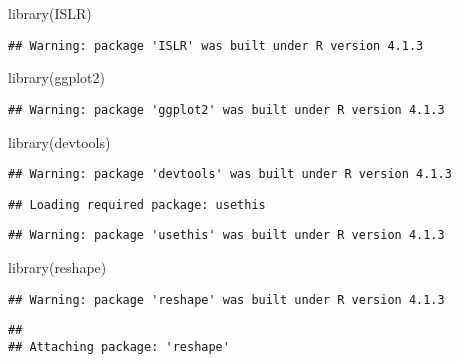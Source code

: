 \documentclass[
]{article}
\newenvironment{Shaded}{\begin{snugshade}}{\end{snugshade}}
\newcommand{\FunctionTok}[1]{\textcolor[rgb]{0.00,0.00,0.00}{#1}}
\newcommand{\NormalTok}[1]{#1}
\begin{document}
\begin{Shaded}
\begin{Highlighting}[]
\FunctionTok{library}\NormalTok{(ISLR)}
\end{Highlighting}
\end{Shaded}

\begin{verbatim}
## Warning: package 'ISLR' was built under R version 4.1.3
\end{verbatim}

\begin{Shaded}
\begin{Highlighting}[]
\FunctionTok{library}\NormalTok{(ggplot2)}
\end{Highlighting}
\end{Shaded}

\begin{verbatim}
## Warning: package 'ggplot2' was built under R version 4.1.3
\end{verbatim}

\begin{Shaded}
\begin{Highlighting}[]
\FunctionTok{library}\NormalTok{(devtools)}
\end{Highlighting}
\end{Shaded}

\begin{verbatim}
## Warning: package 'devtools' was built under R version 4.1.3
\end{verbatim}

\begin{verbatim}
## Loading required package: usethis
\end{verbatim}

\begin{verbatim}
## Warning: package 'usethis' was built under R version 4.1.3
\end{verbatim}

\begin{Shaded}
\begin{Highlighting}[]
\FunctionTok{library}\NormalTok{(reshape)}
\end{Highlighting}
\end{Shaded}

\begin{verbatim}
## Warning: package 'reshape' was built under R version 4.1.3
\end{verbatim}

\begin{verbatim}
## 
## Attaching package: 'reshape'
\end{verbatim}
\end{document}
